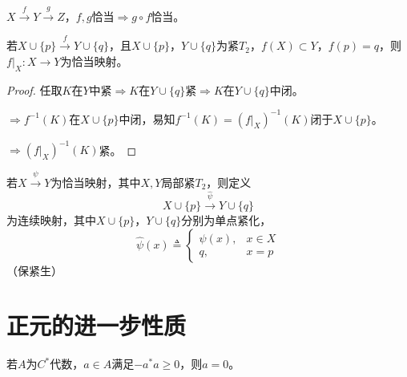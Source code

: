 \documentclass[lang=cn,a4paper,newtx,section]{elegantbook}
\begin{document}
\begin{proposition}
  $X \xrightarrow{f} Y \xrightarrow{g} Z$，$f, g$恰当$\Rightarrow g \circ f$恰当。
\end{proposition}

\begin{proposition}
  若$X \cup \{p\} \xrightarrow{f} Y \cup \{q\}$，且$X \cup \{p\}$，$Y \cup \{q\}$为紧$T_2$，$f(X) \subset Y$，$f(p) = q$，则$f|_X: X \to Y$为恰当映射。
\end{proposition}

\begin{proof}
  任取$K$在$Y$中紧$\Rightarrow K$在$Y \cup \{q\}$紧$\Rightarrow K$在$Y \cup \{q\}$中闭。
  
  $\Rightarrow f^{-1}(K)$在$X \cup \{p\}$中闭，易知$f^{-1}(K) = (f|_X)^{-1}(K)$闭于$X \cup \{p\}$。
  
  $\Rightarrow (f|_X)^{-1}(K)$紧。
\end{proof}

\begin{proposition}
  若$X \xrightarrow{\psi} Y$为恰当映射，其中$X, Y$局部紧$T_2$，则定义
  \begin{equation*}
    X \cup \{p\} \xrightarrow{\hat{\psi}} Y \cup \{q\}
  \end{equation*}
  为连续映射，其中$X \cup \{p\}$，$Y \cup \{q\}$分别为单点紧化，
  \begin{equation*}
    \hat{\psi}(x) \triangleq \begin{cases}
      \psi(x), & x \in X \\
      q, & x = p
    \end{cases}
  \end{equation*}
  （保紧生）
\end{proposition}

\section{正元的进一步性质}

\begin{lemma}\label{lem:neg-pos-zero}
  若$A$为$C^*$代数，$a \in A$满足$-a^*a \geq 0$，则$a = 0$。
\end{lemma}
\end{document}
